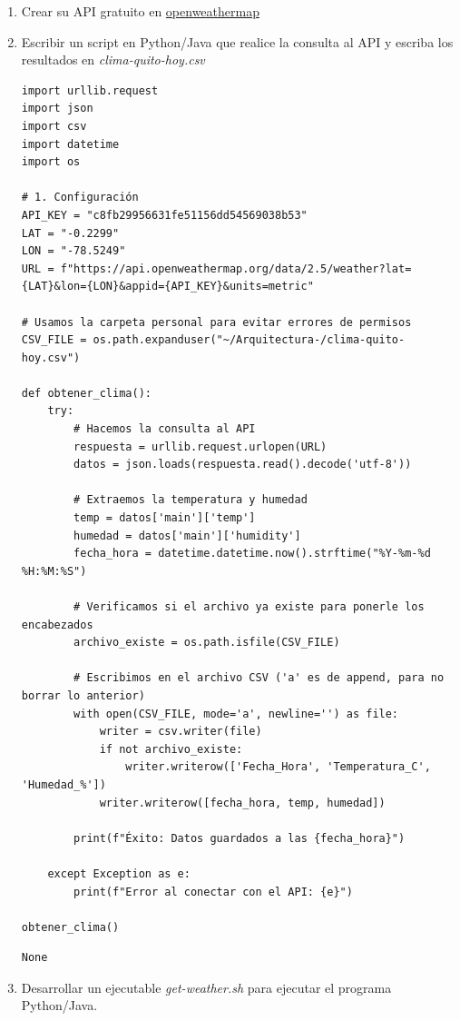 \documentclass{article}
\begin{document}
\begin{enumerate}
\item Crear su API gratuito en \href{https://openweathermap.org/current\#one}{openweathermap}
\item Escribir un script en Python/Java que realice la consulta al API y
escriba los resultados en \emph{clima-quito-hoy.csv}

\begin{verbatim}
import urllib.request
import json
import csv
import datetime
import os

# 1. Configuración
API_KEY = "c8fb29956631fe51156dd54569038b53"
LAT = "-0.2299"
LON = "-78.5249"
URL = f"https://api.openweathermap.org/data/2.5/weather?lat={LAT}&lon={LON}&appid={API_KEY}&units=metric"

# Usamos la carpeta personal para evitar errores de permisos
CSV_FILE = os.path.expanduser("~/Arquitectura-/clima-quito-hoy.csv")

def obtener_clima():
    try:
        # Hacemos la consulta al API
        respuesta = urllib.request.urlopen(URL)
        datos = json.loads(respuesta.read().decode('utf-8'))
        
        # Extraemos la temperatura y humedad
        temp = datos['main']['temp']
        humedad = datos['main']['humidity']
        fecha_hora = datetime.datetime.now().strftime("%Y-%m-%d %H:%M:%S")
        
        # Verificamos si el archivo ya existe para ponerle los encabezados
        archivo_existe = os.path.isfile(CSV_FILE)
        
        # Escribimos en el archivo CSV ('a' es de append, para no borrar lo anterior)
        with open(CSV_FILE, mode='a', newline='') as file:
            writer = csv.writer(file)
            if not archivo_existe:
                writer.writerow(['Fecha_Hora', 'Temperatura_C', 'Humedad_%'])
            writer.writerow([fecha_hora, temp, humedad])
            
        print(f"Éxito: Datos guardados a las {fecha_hora}")
        
    except Exception as e:
        print(f"Error al conectar con el API: {e}")

obtener_clima()
\end{verbatim}

\begin{verbatim}
None
\end{verbatim}

\item Desarrollar un ejecutable \emph{get-weather.sh} para ejecutar el
programa Python/Java.


\end{enumerate}
\end{document}
